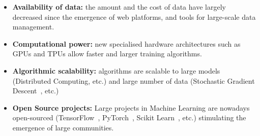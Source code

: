 \begin{itemize}
    \item \textbf{Availability of data:} the amount and the cost of data have largely decreased since the emergence of web platforms, and tools for large-scale data management.
    \item \textbf{Computational power:} new specialised hardware architectures such as GPUs and TPUs allow faster and larger training algorithms.
    \item \textbf{Algorithmic scalability:} algorithms are scalable to large models (Distributed Computing, etc.) and large number of data (Stochastic Gradient Descent~\citep{bottou2010large}, etc.)
    \item \textbf{Open Source projects:} Large projects in Machine Learning are nowadays open-sourced (TensorFlow~\citep{abadi2016deep}, PyTorch~\citep{paszke2017automatic}, Scikit Learn~\citep{sklearn}, etc.) stimulating the emergence of large communities.
\end{itemize}

